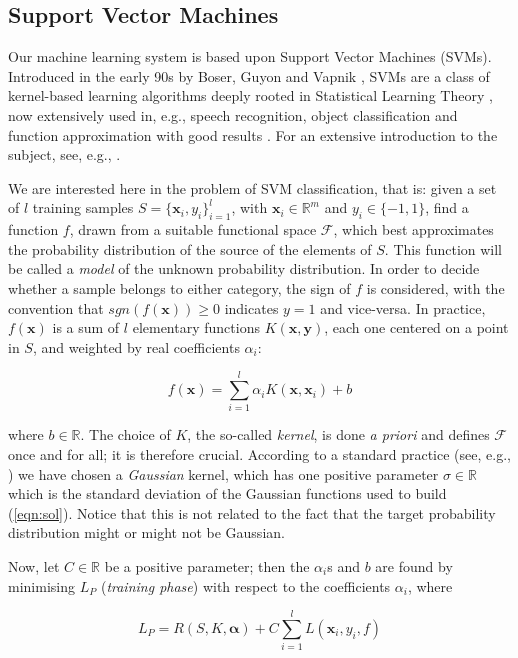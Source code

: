 \documentclass[jou,a4paper,notxfonts]{apa}
\def\RR{\mathbb{R}}
\def\xx{\mathbf{x}}
\def\yy{\mathbf{y}}
\def\aa{\boldsymbol{\alpha}}
\begin{document}
\subsection{Support Vector Machines}
\label{subsec:svm}

Our machine learning system is based upon Support Vector Machines
(SVMs). Introduced in the early 90s by Boser, Guyon and Vapnik
\cite{BGV92}, SVMs are a class of kernel-based learning algorithms
deeply rooted in Statistical Learning Theory \cite{v-edbed-82}, now
extensively used in, e.g., speech recognition, object classification
and function approximation with good results \cite{Cristianini00}. For
an extensive introduction to the subject, see, e.g., \cite{Burges98}.

We are interested here in the problem of SVM classification, that is:
given a set of $l$ training samples $S=\{\xx_i,y_i\}_{i=1}^l$, with
$\xx_i \in \RR^m$ and $y_i \in \{-1,1\}$, find a function $f$, drawn
from a suitable functional space $\mathcal{F}$, which best
approximates the probability distribution of the source of the
elements of $S$. This function will be called a \emph{model} of the
unknown probability distribution. In order to decide whether a sample
belongs to either category, the sign of $f$ is considered, with the
convention that $sgn(f(\xx)) \geq 0$ indicates $y = 1$ and
vice-versa. In practice, $f(\xx)$ is a sum of $l$ elementary functions
$K(\xx,\yy)$, each one centered on a point in $S$, and weighted by
real coefficients $\alpha_i$:

\begin{equation} \label{eqn:sol}
  f(\xx) = \sum_{i=1}^l \alpha_i K(\xx,\xx_i) + b
\end{equation}

\noindent where $b \in \RR$. The choice of $K$, the so-called
\emph{kernel}, is done \emph{a priori} and defines $\mathcal{F}$ once
and for all; it is therefore crucial. According to a standard practice
(see, e.g., \cite{Cristianini00}) we have chosen a \emph{Gaussian}
kernel, which has one positive parameter $\sigma \in \RR$ which is the
standard deviation of the Gaussian functions used to build
(\ref{eqn:sol}). Notice that this is not related to the fact that the
target probability distribution might or might not be Gaussian.

Now, let $C \in \RR$ be a positive parameter; then the $\alpha_i$s and
$b$ are found by minimising $L_P$ (\emph{training phase}) with respect
to the coefficients $\alpha_i$, where

\begin{equation} \label{eqn:svm_primal}
  L_P = R(S,K,\aa) + C \sum_{i=1}^l L(\xx_i,y_i,f)
\end{equation}
\end{document}

